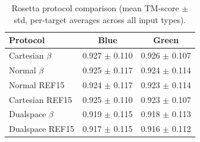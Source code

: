 \begin{table}[htbp]
\centering
\caption{Rosetta protocol comparison (mean TM-score $\pm$ std, per-target averages across all input types).}
\label{tab:rosetta-protocols}
\begin{tabular}{lcc}
\toprule
Protocol & Blue & Green \\
\midrule
  Cartesian $\beta$ & 0.927 $\pm$ 0.110 & 0.926 $\pm$ 0.107 \\
  Normal $\beta$ & 0.925 $\pm$ 0.117 & 0.924 $\pm$ 0.114 \\
  Normal REF15 & 0.924 $\pm$ 0.117 & 0.923 $\pm$ 0.114 \\
  Cartesian REF15 & 0.925 $\pm$ 0.110 & 0.923 $\pm$ 0.107 \\
  Dualspace $\beta$ & 0.919 $\pm$ 0.115 & 0.918 $\pm$ 0.113 \\
  Dualspace REF15 & 0.917 $\pm$ 0.115 & 0.916 $\pm$ 0.112 \\
\bottomrule
\end{tabular}
\end{table}